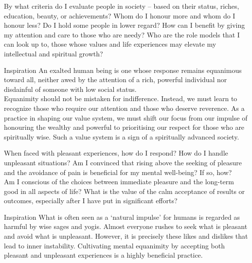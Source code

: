 

\newpage
\begin{mananam}{} 
\mananamtext By what criteria do I evaluate people in society – based on their status, riches, education, beauty, or achievements? Whom do I honour more and whom do I honour less? Do I hold some people in lower regard? How can I benefit by giving my attention and care to those who are needy? Who are the role models that I can look up to, those whose values and life experiences may elevate my intellectual and spiritual growth?
\end{mananam}
\WritingHand{}
\begin{inspiration}{\mananamfont Inspiration}
\mananamtext An exalted human being is one whose response remains equanimous toward all, neither awed by the attention of a rich, powerful individual nor disdainful of someone with low social status.\\
Equanimity should not be mistaken for indifference. Instead, we must learn to recognize those who require our attention and those who deserve reverence. As a practice in shaping our value system, we must shift our focus from our impulse of honouring the wealthy and powerful to prioritising our respect for those who are spiritually wise. Such a value system is a sign of a spiritually advanced society.
\end{inspiration}
\newpage



\newpage
\begin{mananam}{} 
\mananamtext When faced with pleasant experiences, how do I respond? How do I handle unpleasant situations? Am I convinced that rising above the seeking of pleasure and the avoidance of pain is beneficial for my mental well-being? If so, how?\\
Am I conscious of the choices between immediate pleasure and the long-term good in all aspects of life? What is the value of the calm acceptance of results or outcomes, especially after I have put in significant efforts?
\end{mananam}
\WritingHand{}
\begin{inspiration}{\mananamfont Inspiration}
\mananamtext What is often seen as a ‘natural impulse’ for humans is regarded as harmful by wise sages and yogis. Almost everyone rushes to seek what is pleasant and avoid what is unpleasant. However, it is precisely these likes and dislikes that lead to inner instability. Cultivating mental equanimity by accepting both pleasant and unpleasant experiences is a highly beneficial practice.
\end{inspiration}
\newpage


